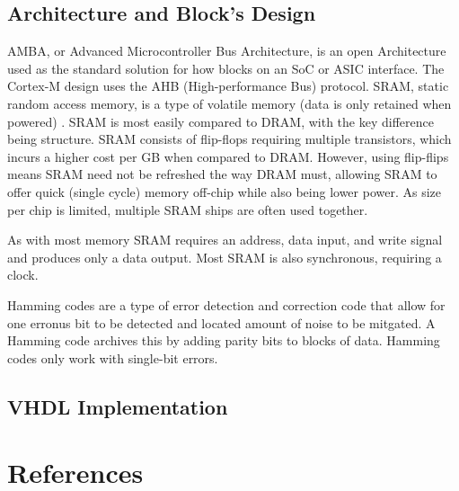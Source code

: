 \documentclass[11pt]{article}
\begin{document}
\subsection{Architecture and Block's Design}
AMBA, or Advanced Microcontroller Bus Architecture, is an open Architecture used as the standard solution for how blocks on an SoC or ASIC interface\cite{amba}.
The Cortex-M design uses the AHB (High-performance Bus) protocol.
SRAM, static random access memory, is a type of volatile memory (data is only retained when powered) \cite{dally}. 
SRAM is most easily compared to DRAM, with the key difference being structure.
SRAM consists of flip-flops requiring multiple transistors, which incurs a higher cost per GB when compared to DRAM.
However, using flip-flips means SRAM need not be refreshed the way DRAM must, allowing SRAM to offer quick (single cycle) memory off-chip while also being lower power.
As size per chip is limited, multiple SRAM ships are often used together.


As with most memory SRAM requires an address, data input, and write signal and produces only a data output. Most SRAM is also synchronous, requiring a clock.

Hamming codes are a type of error detection and correction code that allow for one erronus bit to be detected and located amount of noise to be mitgated.
A Hamming code archives this by adding parity bits to blocks of data.
Hamming codes only work with single-bit errors. \cite{hamming} \cite{ham}
\subsection{VHDL Implementation}

\pagebreak
\appendix
\renewcommand{\thesection}{\Roman{section}}
\section{References}
\printbibliography[heading=none]
\end{document}
